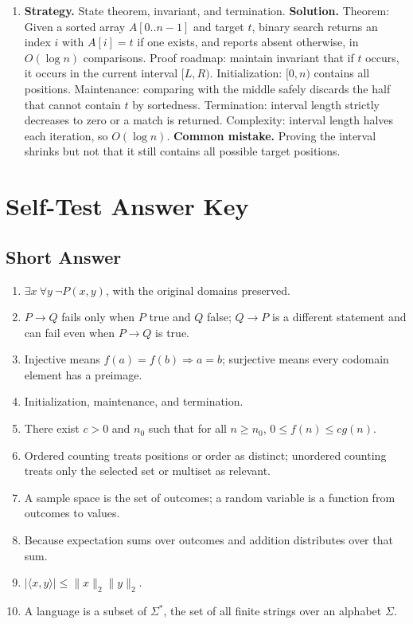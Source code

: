 \documentclass[11pt]{article}
\begin{document}
\begin{enumerate}[label=\textbf{7.\arabic*.}]
\item \textbf{Strategy.} State theorem, invariant, and termination. \textbf{Solution.} Theorem: Given a sorted array $A[0..n-1]$ and target $t$, binary search returns an index $i$ with $A[i]=t$ if one exists, and reports absent otherwise, in $O(\log n)$ comparisons. Proof roadmap: maintain invariant that if $t$ occurs, it occurs in the current interval $[L,R)$. Initialization: $[0,n)$ contains all positions. Maintenance: comparing with the middle safely discards the half that cannot contain $t$ by sortedness. Termination: interval length strictly decreases to zero or a match is returned. Complexity: interval length halves each iteration, so $O(\log n)$. \textbf{Common mistake.} Proving the interval shrinks but not that it still contains all possible target positions.
\end{enumerate}

\section{Self-Test Answer Key}

\subsection*{Short Answer}
\begin{enumerate}[label=\textbf{SA\arabic*.}]
\item $\exists x\ \forall y\ \neg P(x,y)$, with the original domains preserved.
\item $P\to Q$ fails only when $P$ true and $Q$ false; $Q\to P$ is a different statement and can fail even when $P\to Q$ is true.
\item Injective means $f(a)=f(b)\Rightarrow a=b$; surjective means every codomain element has a preimage.
\item Initialization, maintenance, and termination.
\item There exist $c>0$ and $n_0$ such that for all $n\ge n_0$, $0\le f(n)\le c g(n)$.
\item Ordered counting treats positions or order as distinct; unordered counting treats only the selected set or multiset as relevant.
\item A sample space is the set of outcomes; a random variable is a function from outcomes to values.
\item Because expectation sums over outcomes and addition distributes over that sum.
\item $|\langle x,y\rangle|\le \|x\|_2\|y\|_2$.
\item A language is a subset of $\Sigma^*$, the set of all finite strings over an alphabet $\Sigma$.
\end{enumerate}
\end{document}
